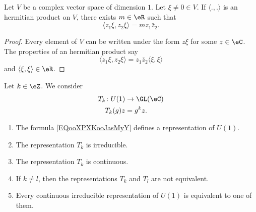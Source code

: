 \begin{proposition}
    Let \( V\) be a complex vector space of dimension \( 1\). Let \( \xi\neq 0\in V\). If \( \langle ., .\rangle \) is an hermitian product on \( V\), there exists \( m\in \eR\) such that
    \begin{equation}
        \langle z_1\xi, z_2\xi\rangle =mz_1\bar z_2.
    \end{equation}
\end{proposition}

\begin{proof}
    Every element of \( V\) can be written under the form \( z\xi\) for some \( z\in \eC\). The properties of an hermitian product say
    \begin{equation}
        \langle z_1\xi, z_2\xi\rangle =z_1\bar z_2\langle \xi, \xi\rangle 
    \end{equation}
    and \( \langle \xi, \xi\rangle \in \eR\).
\end{proof}

\begin{proposition}       \label{PROPooLWWEooUmqbRA}
    Let \( k\in \eZ\). We consider
    \begin{equation}        \label{EQooXPXKooJasMyY}
        \begin{aligned}
            T_k\colon U(1)&\to \GL(\eC) \\
            T_k(g)z&=g^kz.
        \end{aligned}
    \end{equation}
    \begin{enumerate}
        \item
            The formula \eqref{EQooXPXKooJasMyY} defines a representation of \( U(1)\).
        \item
            The representation \( T_k\) is irreducible.
        \item
            The representation \( T_k\) is continuous.
        \item
            If \( k\neq l\), then the representations \( T_k\) and \( T_l\) are not equivalent.
        \item
            Every continuous irreducible representation of \( U(1)\) is equivalent to one of them.
    \end{enumerate}
\end{proposition}

